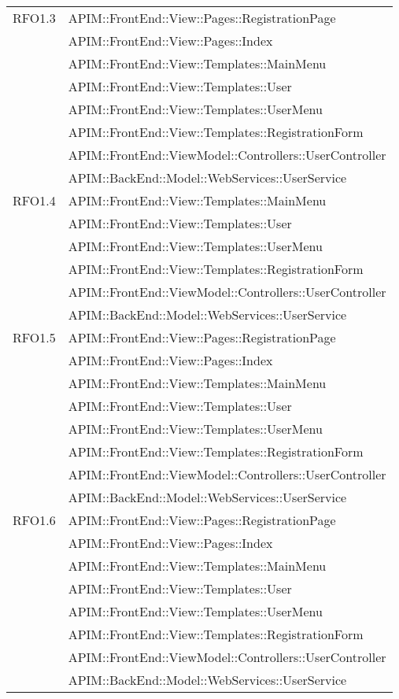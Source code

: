 \begin{longtable}{ p{4cm} | p{12cm} }
		    \hline RFO1.3
		    & APIM::FrontEnd::View::Pages::RegistrationPage \\
			& APIM::FrontEnd::View::Pages::Index \\
			& APIM::FrontEnd::View::Templates::MainMenu \\
			& APIM::FrontEnd::View::Templates::User \\
			& APIM::FrontEnd::View::Templates::UserMenu \\
			& APIM::FrontEnd::View::Templates::RegistrationForm \\
			& APIM::FrontEnd::ViewModel::Controllers::UserController \\
			& APIM::BackEnd::Model::WebServices::UserService \\
			
		    \hline RFO1.4
			& APIM::FrontEnd::View::Templates::MainMenu \\
			& APIM::FrontEnd::View::Templates::User \\
			& APIM::FrontEnd::View::Templates::UserMenu \\
			& APIM::FrontEnd::View::Templates::RegistrationForm \\
			& APIM::FrontEnd::ViewModel::Controllers::UserController \\
			& APIM::BackEnd::Model::WebServices::UserService \\		    
		    
		    \hline RFO1.5
		    & APIM::FrontEnd::View::Pages::RegistrationPage \\
			& APIM::FrontEnd::View::Pages::Index \\
			& APIM::FrontEnd::View::Templates::MainMenu \\
			& APIM::FrontEnd::View::Templates::User \\
			& APIM::FrontEnd::View::Templates::UserMenu \\
			& APIM::FrontEnd::View::Templates::RegistrationForm \\
			& APIM::FrontEnd::ViewModel::Controllers::UserController \\
			& APIM::BackEnd::Model::WebServices::UserService \\
			
		    \hline RFO1.6
		    & APIM::FrontEnd::View::Pages::RegistrationPage \\
			& APIM::FrontEnd::View::Pages::Index \\
			& APIM::FrontEnd::View::Templates::MainMenu \\
			& APIM::FrontEnd::View::Templates::User \\
			& APIM::FrontEnd::View::Templates::UserMenu \\
			& APIM::FrontEnd::View::Templates::RegistrationForm \\
			& APIM::FrontEnd::ViewModel::Controllers::UserController \\
			& APIM::BackEnd::Model::WebServices::UserService \\
			

\end{longtable}
